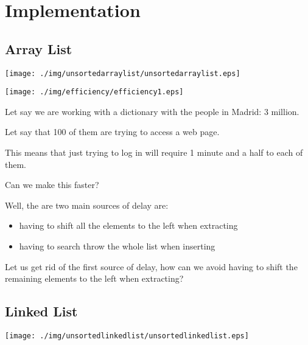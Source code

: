 \documentclass[a4paper, 9pt]{extarticle}
\begin{document}
\newpage

\section{Implementation}

\subsection{Array List}

\begin{center}
  \texttt{[image: ./img/unsortedarraylist/unsortedarraylist.eps]}
\end{center}

\begin{multicols}{2}
\begin{center}
  \texttt{[image: ./img/efficiency/efficiency1.eps]}
\end{center}
\columnbreak

Let say we are working with a dictionary with the people in Madrid: 3 million.

Let say that 100 of them are trying to access a web page.

This means that just trying to log in will require 1 minute and a half to each of them.

Can we make this faster?

Well, the are two main sources of delay are:

\begin{itemize}
  \item having to shift all the elements to the left when extracting
  \item having to search throw the whole list when inserting
\end{itemize}

Let us get rid of the first source of delay, how can we avoid having to shift
the remaining elements to the left when extracting?

\end{multicols}

\newpage

\subsection{Linked List}

\begin{center}
  \texttt{[image: ./img/unsortedlinkedlist/unsortedlinkedlist.eps]}
\end{center}
\end{document}
